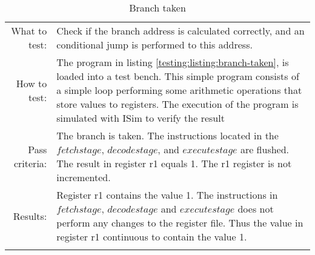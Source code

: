 \begin{table}[H]
  \begin{tabular}{r | p{8cm}}
    \noalign{\smallskip}\hline\noalign{\smallskip}
    
    What to test:  & Check if the branch address is calculated correctly, and an conditional
                     jump is performed to this address. \\

    \noalign{\smallskip}\hline\noalign{\smallskip}

    How to test:   &  The program in listing \ref{testing:listing:branch-taken}, is loaded into a test bench.
                      This simple program consists of a simple loop performing some arithmetic
                      operations that store values to registers. The execution of the
                      program is simulated with ISim to verify the result \\

    \noalign{\smallskip}\hline\noalign{\smallskip}

    Pass criteria: &  The branch is taken. The instructions located in the $fetch stage$, 
                       $decode stage$, and $execute stage$ are flushed. The result in register r1 equals 1. 
                       The r1 register is not incremented. \\

    \noalign{\smallskip}\hline\noalign{\smallskip}
    
    Results: &  Register r1 contains the value 1. The instructions in $fetch
                stage$, $decode stage$ and $execute stage$ does not perform any  
                changes to the register file. Thus the value in register r1 continuous to contain the
                value 1.  \\
   \noalign{\smallskip}\hline\noalign{\smallskip}
  
  
  
  \end{tabular}
  \caption{Branch taken}
  \label{testing:fitness:branch_taken}
\end{table}
